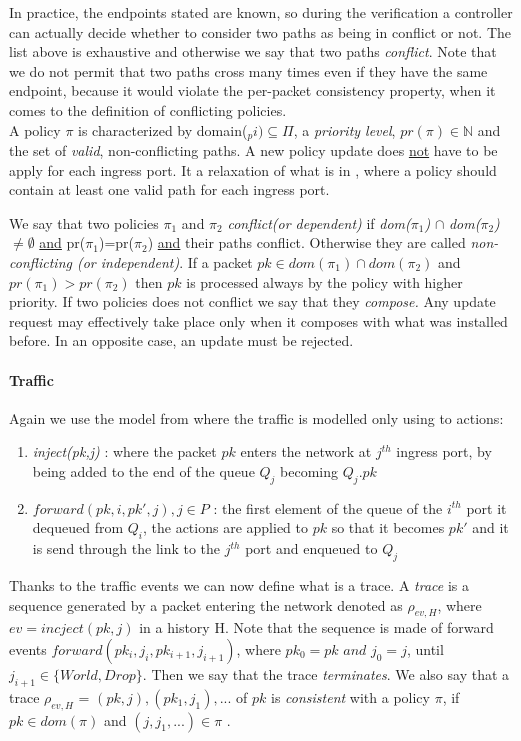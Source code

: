 \documentclass{article}
\theoremstyle{remark}
\begin{document}
    In practice, the endpoints stated are known, so during the verification a controller can actually decide whether to consider two paths as being in conflict or not.
    The list above is exhaustive and otherwise we say that two paths \emph{conflict}. Note that we do not permit that two paths cross many times even if they have the same endpoint, because it would violate the per-packet consistency property, when it comes to the definition of conflicting policies.\\
    A policy $\pi$ is characterized by domain($_pi)\subseteq\Pi$, a \emph{priority level}, $pr(\pi)\in\mathbb{N}$ and the set of \emph{valid}, non-conflicting paths. A new policy update does \underline{not} have to be apply for each ingress port. It a relaxation of what is in \cite{CKLS15}, where a policy should contain at least one valid path for each ingress port.
    
We say that two policies $\pi_1$ and $\pi_2$ \emph{conflict(or dependent)} if \emph{dom($\pi_1$)} $\cap$ \emph{dom($\pi_2$)} $\neq \emptyset$ \underline{and} pr($\pi_1$)=pr($\pi_2$) \underline{and} their paths conflict. Otherwise they are called \emph{non-conflicting (or independent)}.
If a packet $pk\in dom(\pi_1) \cap dom(\pi_2)$ and $pr(\pi_1)>pr(\pi_2)$ then $pk$ is processed always by the policy with higher priority. 
If two policies does not conflict we say that they \emph{compose.} Any update request may effectively take place only when it composes with what was installed before. In an opposite case, an update must be rejected.
\paragraph{Traffic} Again we use the model from \cite{CKLS15} where the traffic is modelled only using to actions:
\begin{enumerate}
\item \emph{inject(pk,j)} : where the packet $pk$ enters the network at $j^{th}$ ingress port, by being added to the end of the queue $Q_j$ becoming $Q_j.pk$
\item $forward(pk,i,pk',j), j\in P$ : the first element of the queue of the $i^{th}$ port it dequeued from $Q_i$, the actions are applied to $pk$ so that it becomes $pk'$ and it is send through the link to the $j^{th}$ port and enqueued to $Q_j$
\end{enumerate}
Thanks to the traffic events we can now define what is a trace. A \emph{trace} is a sequence generated by a packet entering the network denoted as $\rho_{ev,H}$, where $ev = incject(pk,j)$ in a history H. Note that the sequence is made of forward events $forward(pk_i,j_i,pk_{i+1},j_{i+1})$, where $pk_0=pk \textit{ and } j_0=j$, until $j_{i+1} \in\lbrace World, Drop \rbrace$. Then we say that the trace \emph{terminates}.
We also say that a trace $\rho_{ev,H}$ = $(pk,j),(pk_1,j_1),...$ of $pk$ is \emph{consistent} with a policy $\pi$, if $pk\in dom(\pi)$ and $(j,j_1,...)\in \pi$ \cite{CKLS15}.
\end{document}
